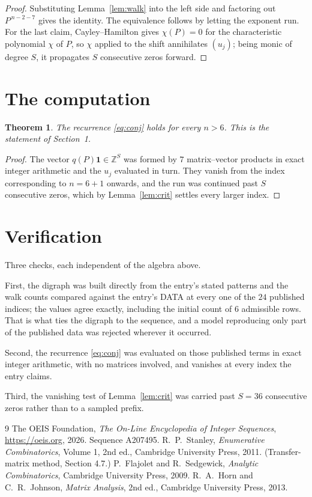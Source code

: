 \documentclass[11pt,a4paper]{article}
\theoremstyle{plain}
\newtheorem{theorem}{Theorem}
\theoremstyle{definition}
\begin{document}
\begin{proof}
Substituting Lemma~\ref{lem:walk} into the left side and factoring out
$P^{\,n-2-7}$ gives the identity. The equivalence follows by letting the exponent
run. For the last claim, Cayley--Hamilton gives $\chi(P)=0$ for the characteristic
polynomial $\chi$ of $P$, so $\chi$ applied to the shift annihilates $(u_j)$; being monic of
degree $S$, it propagates $S$ consecutive zeros forward.
\end{proof}

\section{The computation}

\begin{theorem}
The recurrence \eqref{eq:conj} holds for every $n>6$. This is the statement of
Section~1.
\end{theorem}

\begin{proof}
The vector $q(P)\mathbf{1}\in\mathbb{Z}^{S}$ was formed by $7$ matrix--vector
products in exact integer arithmetic and the $u_j$ evaluated in turn. They vanish from the
index corresponding to $n=6+1$ onwards, and the run was continued past $S$ consecutive
zeros, which by Lemma~\ref{lem:crit} settles every larger index.
\end{proof}

\section{Verification}

Three checks, each independent of the algebra above.

First, the digraph was built directly from the entry's stated patterns and the walk counts
compared against the entry's DATA at every one of the $24$ published indices; the
values agree exactly, including the initial count of $6$ admissible rows. That is
what ties the digraph to the sequence, and a model reproducing only part of the published
data was rejected wherever it occurred.

Second, the recurrence \eqref{eq:conj} was evaluated on those published terms in exact
integer arithmetic, with no matrices involved, and vanishes at every index the entry claims.

Third, the vanishing test of Lemma~\ref{lem:crit} was carried past $S=36$ consecutive
zeros rather than to a sampled prefix.

\begin{thebibliography}{9}
 The OEIS Foundation, \emph{The On-Line Encyclopedia of Integer
Sequences}, \url{https://oeis.org}, 2026. Sequence A207495.
 R.~P.~Stanley, \emph{Enumerative Combinatorics}, Volume 1, 2nd ed.,
Cambridge University Press, 2011. (Transfer-matrix method, Section 4.7.)
 P.~Flajolet and R.~Sedgewick, \emph{Analytic Combinatorics}, Cambridge
University Press, 2009.
 R.~A.~Horn and C.~R.~Johnson, \emph{Matrix Analysis}, 2nd ed., Cambridge
University Press, 2013.
\end{thebibliography}
\end{document}

